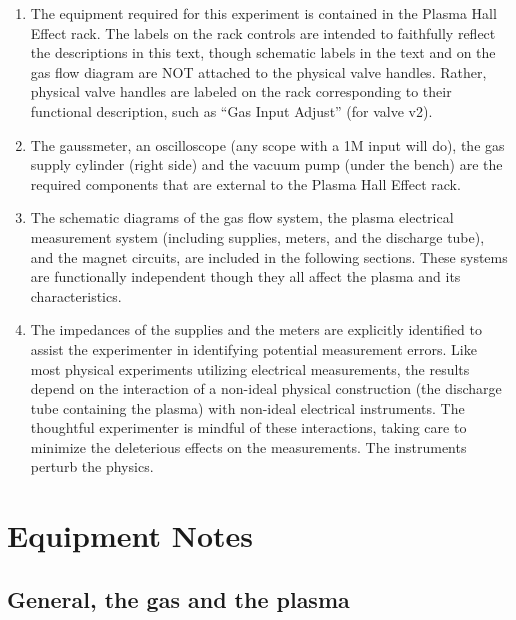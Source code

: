 \documentclass{../lab}
\begin{document}
\begin{enumerate}
    \item The equipment required for this experiment is contained in the Plasma Hall Effect rack. The labels on the rack controls are intended to faithfully reflect the descriptions in this text, though schematic labels in the text and on the gas flow diagram are NOT attached to the physical valve handles. Rather, physical valve handles are labeled on the rack corresponding to their functional description, such as ``Gas Input Adjust'' (for valve v2).

    \item The gaussmeter, an oscilloscope (any scope with a 1M input will do), the gas supply cylinder (right side) and the vacuum pump (under the bench) are the required components that are external to the Plasma Hall Effect rack.

    \item The schematic diagrams of the gas flow system, the plasma electrical measurement system (including supplies, meters, and the discharge tube), and the magnet circuits, are included in the following sections. These systems are functionally independent though they all affect the plasma and its characteristics.

    \item The impedances of the supplies and the meters are explicitly identified to assist the experimenter in identifying potential measurement errors. Like most physical experiments utilizing electrical measurements, the results depend on the interaction of a non-ideal physical construction (the discharge tube containing the plasma) with non-ideal electrical instruments. The thoughtful experimenter is mindful of these interactions, taking care to minimize the deleterious effects on the measurements. The instruments perturb the physics.

\end{enumerate}

\section{Equipment Notes}

\subsection{General, the gas and the plasma}
\end{document}
